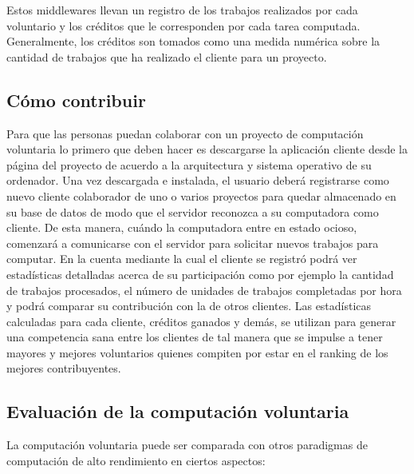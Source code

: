 Estos middlewares llevan un registro de los trabajos realizados por cada voluntario y los créditos que le corresponden por cada tarea computada. 
Generalmente, los créditos son tomados como una medida numérica sobre la cantidad de trabajos que ha realizado el cliente para un proyecto.

\subsection{Cómo contribuir}

Para que las personas puedan colaborar con un proyecto de computación voluntaria lo primero que deben hacer es descargarse la aplicación cliente desde 
la página del proyecto de acuerdo a la arquitectura y sistema operativo de su ordenador. Una vez descargada e instalada, el usuario deberá registrarse 
como nuevo cliente colaborador de uno o varios proyectos para quedar almacenado en su base de datos de modo que el servidor reconozca a su computadora
 como cliente. De esta manera, cuándo la computadora entre en estado ocioso, comenzará a comunicarse con el servidor para solicitar nuevos trabajos para
 computar.
En la cuenta mediante la cual el cliente se registró podrá ver estadísticas detalladas acerca de su participación como por ejemplo la cantidad de trabajos
 procesados, el número de unidades de trabajos completadas por hora y podrá comparar su contribución con la de otros clientes. Las estadísticas calculadas
 para cada cliente, créditos ganados y demás, se utilizan para generar una competencia sana entre los clientes de tal manera que se impulse a tener mayores
 y mejores voluntarios quienes compiten por estar en el ranking de los mejores contribuyentes.

\subsection{Evaluación de la computación voluntaria}

La computación voluntaria puede ser comparada con otros paradigmas de computación de alto rendimiento en ciertos aspectos:

